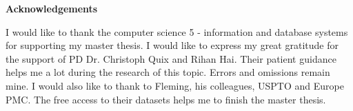 \thispagestyle{empty}

\centerline{\Large{\textbf{Acknowledgements}}}

\vspace{2cm}

\noindent 
I would like to thank the computer science 5 - information and database systems for supporting my master thesis. I would like to express my great gratitude for the support of PD Dr. Christoph Quix and Rihan Hai. Their patient guidance helps me a lot during the research of this topic. Errors and omissions remain mine. I would also like to thank to Fleming, his colleagues, USPTO and Europe PMC. The free access to their datasets helps me to finish the master thesis. 

\newpage
\thispagestyle{empty}

\rule{0cm}{5cm}